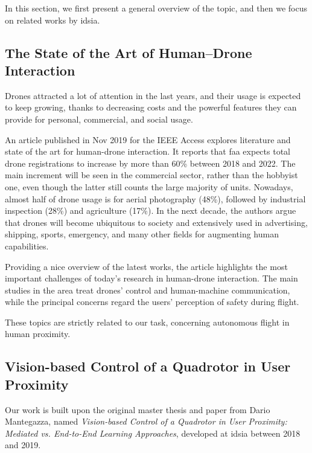 In this section, we first present a general overview of the topic, and then we focus on related works by \gls{idsia}.



\subsection{The State of the Art of Human–Drone Interaction}
\label{subsec:human-drone-sota}

Drones attracted a lot of attention in the last years, and their usage is expected to keep growing, thanks to decreasing costs and the powerful features they can provide for personal, commercial, and social usage.

An article published in Nov 2019 for the IEEE Access \cite{human-drone-sota} explores literature and state of the art for human-drone interaction. It reports that \gls{faa} expects total drone registrations to increase by more than 60\% between 2018 and 2022. The main increment will be seen in the commercial sector, rather than the hobbyist one, even though the latter still counts the large majority of units. Nowadays, almost half of drone usage is for aerial photography (48\%), followed by industrial inspection (28\%) and agriculture (17\%). In the next decade, the authors argue that drones will become ubiquitous to society and extensively used in advertising, shipping, sports, emergency, and many other fields for augmenting human capabilities.

Providing a nice overview of the latest works, the article highlights the most important challenges of today's research in human-drone interaction. The main studies in the area treat drones' control and human-machine communication, while the principal concerns regard the users' perception of safety during flight.

These topics are strictly related to our task, concerning autonomous flight in human proximity.



\subsection{Vision-based Control of a Quadrotor in User Proximity}
\label{subsec:sota-dario}

Our work is built upon the original master thesis \cite{mantegazza2018thesis} and paper \cite{mantegazza2019visionbased} from Dario Mantegazza, named \textit{Vision-based Control of a Quadrotor in User Proximity: Mediated vs. End-to-End Learning Approaches}, developed at \gls{idsia} between 2018 and 2019.

